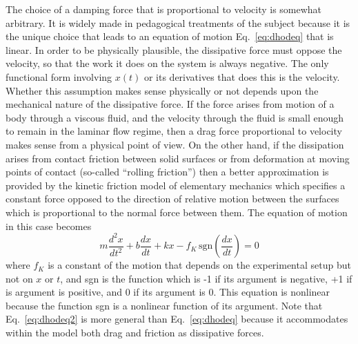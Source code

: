 \documentclass{revtex4}
\begin{document}
The choice of a damping force that is proportional to velocity is somewhat
arbitrary.  It is widely made in pedagogical treatments of the subject 
because it is the unique choice that leads to an equation of motion
Eq.~\ref{eq:dhodeq} that is linear.  In order to be physically plausible,
the dissipative force must oppose the velocity, so that the work it does on
the system is always negative.  The only functional form involving $x(t)$ 
or its derivatives that does this is the velocity.  Whether this assumption
makes sense physically or not depends upon the mechanical nature of the
dissipative force.  If the force arises from motion of a body through a
viscous fluid, and the velocity through the fluid is small enough to remain
in the laminar flow regime, then a drag force proportional to velocity makes
sense from a physical point of view.  On the other hand, if the dissipation
arises from contact friction between solid surfaces or from deformation
at moving points of contact (so-called ``rolling friction'') then a better
approximation is provided by the kinetic friction model of elementary
mechanics which specifies a constant force opposed to the direction of
relative motion between the surfaces which is proportional to the normal
force between them.  The equation of motion in this case becomes
\begin{equation}
m\frac{d^2 x}{dt^2}+b\frac{dx}{dt}+kx-f_K\,\mbox{sgn}\left(\frac{dx}{dt}\right) = 0
\label{eq:dhodeq2}
\end{equation}
where $f_K$ is a constant of the motion that depends on the experimental
setup but not on $x$ or $t$, and sgn is the function which is -1 if
its argument is negative, +1 if is argument is positive, and 0 if its
argument is 0.  This equation is nonlinear because the function sgn is
a nonlinear function of its argument.  Note that Eq.~\ref{eq:dhodeq2} is
more general than Eq.~\ref{eq:dhodeq} because it accommodates within the
model both drag and friction as dissipative forces.
\end{document}
